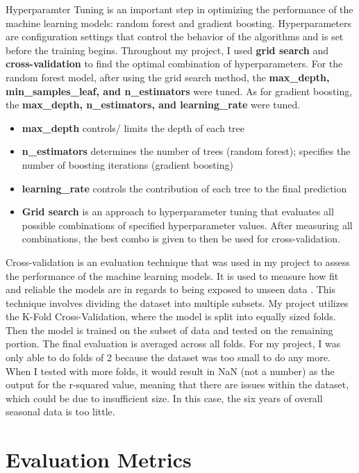 \documentclass[10pt,twocolumn]{article}
\begin{document}
Hyperparamter Tuning is an important step in optimizing the performance of the machine learning models: random forest and gradient boosting. Hyperparameters are configuration settings that control the behavior of the algorithms and is set before the training begins. Throughout my project, I used \textbf{grid search} and \textbf{cross-validation }to find the optimal combination of hyperparameters. For the random forest model, after using the grid search method, the \textbf{max\_depth, min\_samples\_leaf, and n\_estimators} were tuned. As for gradient boosting, the \textbf{max\_depth, n\_estimators, and learning\_rate }were tuned.

\begin{itemize}
    \item \textbf{max\_depth} controls/ limits the depth of each tree 
    \item \textbf{n\_estimators} determines the number of trees (random forest); specifies the number of boosting iterations (gradient boosting)
    \item \textbf{learning\_rate} controls the contribution of each tree to the final prediction 
    \item \textbf{Grid search} is an approach to hyperparameter tuning that evaluates all possible combinations of specified hyperparameter values. After measuring all combinations, the best combo is given to then be used for cross-validation. 
\end{itemize}

Cross-validation is an evaluation technique that was used in my project to assess the performance of the machine learning models. It is used to measure how fit and reliable the models are in regards to being exposed to unseen data \cite{18}. This technique involves dividing the dataset into multiple subsets. My project utilizes the K-Fold Cross-Validation, where the model is split into equally sized folds. Then the model is trained on the subset of data and tested on the remaining portion. The final evaluation is averaged across all folds. For my project, I was only able to do folds of 2 because the dataset was too small to do any more. When I tested with more folds, it would result in NaN (not a number) as the output for the r-squared value, meaning that there are issues within the dataset, which could be due to insufficient size. In this case, the six years of overall seasonal data is too little.  

\section{Evaluation Metrics}
\end{document}
